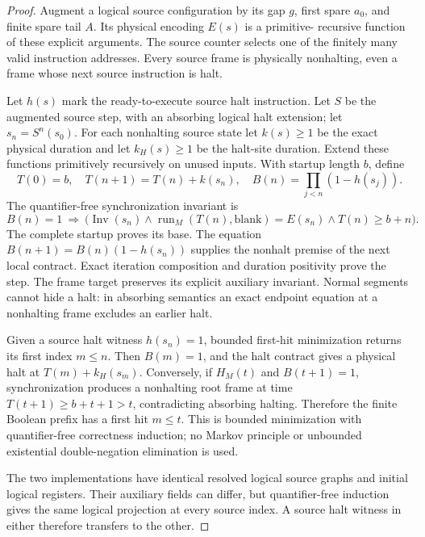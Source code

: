 \documentclass[11pt]{article}
\begin{document}
\begin{proof}
Augment a logical source configuration by its gap $g$, first spare $a_0$,
and finite spare tail $A$. Its physical encoding $E(s)$ is a primitive-
recursive function of these explicit arguments. The source counter
selects one of the finitely many valid instruction addresses. Every
source frame is physically nonhalting, even a frame whose next source
instruction is halt.

Let $h(s)$ mark the ready-to-execute source halt instruction. Let $S$ be
the augmented source step, with an absorbing logical halt extension;
let $s_n=S^n(s_0)$. For each nonhalting source state let $k(s)\ge1$ be the
exact physical duration and let $k_H(s)\ge1$ be the halt-site duration.
Extend these functions primitively recursively on unused inputs. With
startup length $b$, define
\[
 T(0)=b,\quad T(n+1)=T(n)+k(s_n),\quad
 B(n)=\prod_{j<n}(1-h(s_j)).
\]
The quantifier-free synchronization invariant is
\[
 B(n)=1\ \Longrightarrow\
 \bigl(\operatorname{Inv}(s_n)\land
 \operatorname{run}_M(T(n),\mathrm{blank})=E(s_n)
 \land T(n)\ge b+n\bigr).
\]
The complete startup proves its base. The equation
$B(n+1)=B(n)(1-h(s_n))$ supplies the nonhalt premise of the next local
contract. Exact iteration composition and duration positivity prove the
step. The frame target preserves its explicit auxiliary invariant.
Normal segments cannot hide a halt: in absorbing semantics an exact
endpoint equation at a nonhalting frame excludes an earlier halt.

Given a source halt witness $h(s_n)=1$, bounded first-hit minimization
returns its first index $m\le n$. Then $B(m)=1$, and the halt contract
gives a physical halt at $T(m)+k_H(s_m)$. Conversely, if $H_M(t)$ and
$B(t+1)=1$, synchronization produces a nonhalting root frame at time
$T(t+1)\ge b+t+1>t$, contradicting absorbing halting. Therefore the finite
Boolean prefix has a first hit $m\le t$. This is bounded minimization
with quantifier-free correctness induction; no Markov principle or
unbounded existential double-negation elimination is used.

The two implementations have identical resolved logical source graphs
and initial logical registers. Their auxiliary fields can differ, but
quantifier-free induction gives the same logical projection at every
source index. A source halt witness in either therefore transfers to
the other.


\end{proof}
\end{document}
